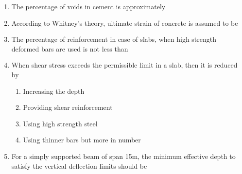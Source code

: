 \documentclass[11pt,a4paper]{article}
\begin{document}
\begin{enumerate}
\item{The percentage of voids in cement is approximately}
\\
\item{According to Whitney's theory, ultimate strain of concrete is assumed to be
}
\\
\item{The percentage of reinforcement in case of slabs, when high strength deformed bars are used is not less than}
\\
\item{When shear stress exceeds the permissible limit in a slab, then it is reduced by}
\begin{enumerate}[label=\Alph*.]
\item{Increasing the depth}
\item{Providing shear reinforcement}
\item{Using high strength steel}
\item{Using thinner bars but more in number}
\end{enumerate}
\item{For a simply supported beam of span 15m, the minimum effective depth to satisfy the vertical deflection limits should be}
\\\begin{enumerate*}[itemjoin=\qquad, label=\Alph*.]

\end{enumerate*}
\end{enumerate}
\end{document}
